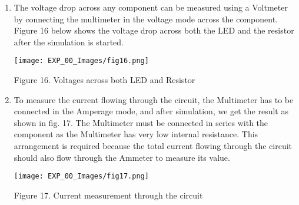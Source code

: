 \documentclass[12pt,a4paper]{article}
\begin{document}
\begin{justify}
\begin{enumerate}
\begin{center} 
\texttt{[image: EXP\_00\_Images/fig15.png]}
\end{center}
\vspace{-8mm}
\begin{center} {Figure 15. Voltage reading after start of the simulation}\end{center}

In our circuit, the potential difference across the battery (terminals of the power supply) is 5V to 0V, 5V at negative and positive terminals, respectively. As the current flows and the circuit encounter, some resistance and some potentials are lost, voltage drops across that component. For example, a voltage drop can be observed in fig.16 across the resistor, and the LED as both offer resistance to the circuit.\par
Make sure we are connecting the LED using proper resistance. If a very small value is given, there is a possibility of a short circuit and the LED burns. We can check by decreasing the resistance up to 10$\Omega$, and the LED will burn.

\item The voltage drop across any component can be measured using a Voltmeter by connecting the multimeter in the voltage mode across the component. Figure 16 below shows the voltage drop across both the LED and the resistor after the simulation is started.

\begin{center} 
\texttt{[image: EXP\_00\_Images/fig16.png]}
\end{center}
\vspace{-8mm}
\begin{center} {Figure 16. Voltages across both LED and Resistor}\end{center}


\item To measure the current flowing through the circuit, the Multimeter has to be connected in the Amperage mode, and after simulation, we get the result as shown in fig. 17. The Multimeter must be connected in series with the component as the Multimeter has very low internal resistance. This arrangement is required because the total current flowing through the circuit should also flow through the Ammeter to measure its value.   

\begin{center} 
\texttt{[image: EXP\_00\_Images/fig17.png]}
\end{center}
\vspace{-8mm}
\begin{center} {Figure 17. Current measurement through the circuit}\end{center}



\end{enumerate}
\end{justify}
\end{document}
